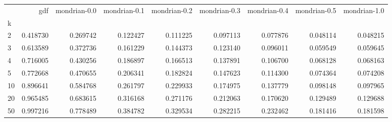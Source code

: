 \begin{tabular}{lrrrrrrrr}
\toprule
{} &       gdf &  mondrian-0.0 &  mondrian-0.1 &  mondrian-0.2 &  mondrian-0.3 &  mondrian-0.4 &  mondrian-0.5 &  mondrian-1.0 \\
k  &           &               &               &               &               &               &               &               \\
\midrule
2  &  0.418730 &      0.269742 &      0.122427 &      0.111225 &      0.097113 &      0.077876 &      0.048114 &      0.048215 \\
3  &  0.613589 &      0.372736 &      0.161229 &      0.144373 &      0.123140 &      0.096011 &      0.059549 &      0.059645 \\
4  &  0.716005 &      0.430256 &      0.186897 &      0.166513 &      0.137891 &      0.106700 &      0.068128 &      0.068163 \\
5  &  0.772668 &      0.470655 &      0.206341 &      0.182824 &      0.147623 &      0.114300 &      0.074364 &      0.074208 \\
10 &  0.896641 &      0.584768 &      0.261797 &      0.229933 &      0.174975 &      0.137779 &      0.098148 &      0.097965 \\
20 &  0.965485 &      0.683615 &      0.316168 &      0.271176 &      0.212063 &      0.170620 &      0.129489 &      0.129688 \\
50 &  0.997216 &      0.778489 &      0.384782 &      0.329534 &      0.282215 &      0.232462 &      0.181416 &      0.181598 \\
\bottomrule
\end{tabular}
